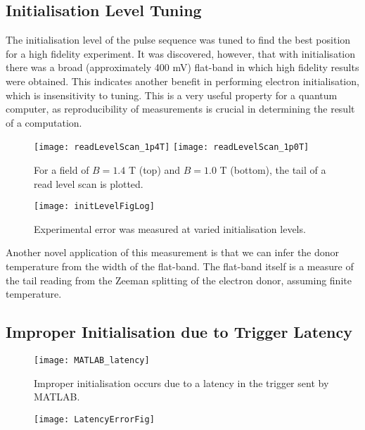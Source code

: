 \subsection{Initialisation Level Tuning}
	The initialisation level of the pulse sequence was tuned to find the best position for a high fidelity experiment. It was discovered, however, that with initialisation there was a broad (approximately 400 mV) flat-band in which high fidelity results were obtained. This indicates another benefit in performing electron initialisation, which is insensitivity to tuning. This is a very useful property for a quantum computer, as reproducibility of measurements is crucial in determining the result of a computation.
%	
	\begin{figure}[htbp!]
		\flushleft
		\texttt{[image: readLevelScan\_1p4T]}
		\texttt{[image: readLevelScan\_1p0T]}
		\caption{For a field of $B = 1.4$ T (top) and $B = 1.0$ T (bottom), the tail of a read level scan is plotted.}
		\label{fig::readLevel}
	\end{figure}
	
	\begin{figure}[htbp!]
		\centering
		\texttt{[image: initLevelFigLog]}
		\caption{Experimental error was measured at varied initialisation levels.}
		\label{fig::initLevel}
	\end{figure}
	
	Another novel application of this measurement is that we can infer the donor temperature from the width of the flat-band. The flat-band itself is a measure of the tail reading from the Zeeman splitting of the electron donor, assuming finite temperature.

\subsection{Improper Initialisation due to Trigger Latency}
	
	\begin{figure}[htbp!]
		\centering
		\texttt{[image: MATLAB\_latency]}
		\caption{Improper initialisation occurs due to a latency in the trigger sent by MATLAB.}
		\label{fig::latency}
	\end{figure}
	
	\begin{figure}[htbp]
		\centering
		\texttt{[image: LatencyErrorFig]}
		\caption{}
		\label{fig::latency_errors}
	\end{figure}
	

	